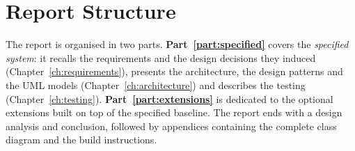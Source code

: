 \section{Report Structure}
The report is organised in two parts. \textbf{Part~\ref{part:specified}} covers
the \emph{specified system}: it recalls the requirements and the design
decisions they induced (Chapter~\ref{ch:requirements}), presents the
architecture, the design patterns and the UML models
(Chapter~\ref{ch:architecture}) and describes the testing
(Chapter~\ref{ch:testing}). \textbf{Part~\ref{part:extensions}} is dedicated to
the optional extensions built on top of the specified baseline. The report ends
with a design analysis and conclusion, followed by appendices containing the
complete class diagram and the build instructions.
